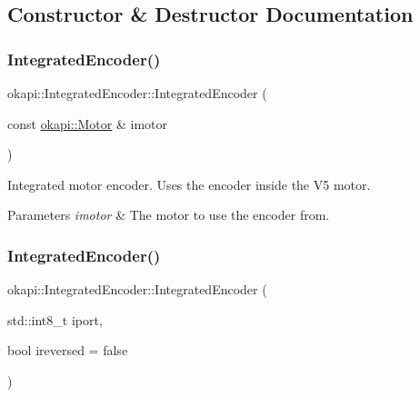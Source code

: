 \subsection{Constructor \& Destructor Documentation}
\mbox{\label{classokapi_1_1IntegratedEncoder_a05d0256b51e3631d9ee9177c4eafcb99}} 
\subsubsection{\texorpdfstring{IntegratedEncoder()}{IntegratedEncoder()}\hspace{0.1cm}{\footnotesize\ttfamily [1/2]}}
{\footnotesize\ttfamily okapi\+::\+Integrated\+Encoder\+::\+Integrated\+Encoder (\begin{DoxyParamCaption}\item[{const \mbox{\hyperlink{classokapi_1_1Motor}{okapi\+::\+Motor}} \&}]{imotor }\end{DoxyParamCaption})}

Integrated motor encoder. Uses the encoder inside the V5 motor.


\begin{DoxyParams}{Parameters}
{\em imotor} & The motor to use the encoder from. \\
\hline
\end{DoxyParams}
\mbox{\label{classokapi_1_1IntegratedEncoder_a8bf2f0ca1b334f23b4aab5afe58cc578}} 
\subsubsection{\texorpdfstring{IntegratedEncoder()}{IntegratedEncoder()}\hspace{0.1cm}{\footnotesize\ttfamily [2/2]}}
{\footnotesize\ttfamily okapi\+::\+Integrated\+Encoder\+::\+Integrated\+Encoder (\begin{DoxyParamCaption}\item[{std\+::int8\+\_\+t}]{iport,  }\item[{bool}]{ireversed = {\ttfamily false} }\end{DoxyParamCaption})}

